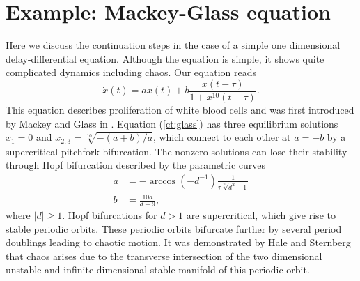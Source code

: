 \documentclass[10pt,a4paper]{ddedoc}
\begin{document}
\section{Example: Mackey-Glass equation}

Here we discuss the continuation steps in the case of a simple one dimensional
delay-differential equation. Although the equation is simple, it shows quite
complicated dynamics including chaos. Our equation reads
\begin{equation}
  \dot{x} ( t ) = ax ( t ) + b \frac{x ( t - \tau )}{1 + x^{10} ( t - \tau )}. \label{ct:glass}
\end{equation}
This equation describes proliferation of white blood cells and was first
introduced by Mackey and Glass in {\cite{mackey}}. Equation (\ref{ct:glass})
has three equilibrium solutions $x_1 = 0$ and $x_{2, 3} = \sqrt[10]{- ( a + b
) / a}$, which connect to each other at $a = - b$ by a supercritical pitchfork
bifurcation. The nonzero solutions can lose their stability through Hopf
bifurcation described by the parametric curves
\begin{align*}
  a & =-\arccos(-d^{-1}){\frac{1}{{\tau} {\sqrt[10]{d^2-1}}}}\\
  b & ={\frac{10a}{d-9}},
\end{align*}
where $|d| \ge 1$. Hopf bifurcations for $d > 1$ are supercritical, which give
rise to stable periodic orbits. These periodic orbits bifurcate further by
several period doublings leading to chaotic motion. It was demonstrated by
Hale and Sternberg {\cite{sternberg}} that chaos arises due to the transverse
intersection of the two dimensional unstable and infinite dimensional stable
manifold of this periodic orbit.
\end{document}
